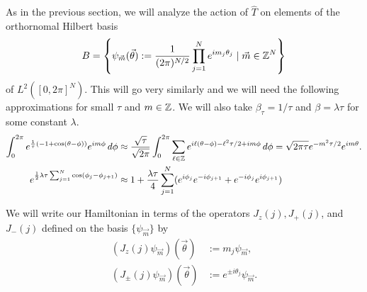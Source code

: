 \documentclass[11pt,reqno]{amsart}
\begin{document}
	As in the previous section, we will analyze the action of $\hat{T}$ on elements of the orthornomal Hilbert basis 
		\[ B=\left\{\psi_{\vec{m}}(\vec{\theta}) := \frac{1}{(2\pi)^{N/2}}\prod_{j=1}^N e^{im_j\theta_j} \mid \vec{m} \in \mathbb{Z}^N \right\} \]
	of $L^2([0,2\pi]^N)$.
	This will go very similarly and we will need the following approximations for small $\tau$ and $m\in \mathbb{Z}$.
	We will also take $\beta_\tau=1/\tau$ and $\beta=\lambda\tau$ for some constant $\lambda$.
	\begin{align}
		\int_0^{2\pi} e^{\frac{1}{\tau}(-1+\cos(\theta-\phi))}e^{im\phi} \, d\phi &\approx \frac{\sqrt{\tau}}{\sqrt{2\pi}} \int_0^{2\pi}\sum_{\ell \in \mathbb{Z}} e^{i\ell (\theta -\phi)-\ell^2\tau/2+im\phi}\, d\phi = \sqrt{2\pi \tau}e^{-m^2\tau/2} e^{im\theta}.\label{eq:O2_bessel_approx_int} \\
		e^{\frac{1}{2}\lambda\tau \sum_{j=1}^N \cos(\phi_j-\phi_{j+1})}&\approx 1+\frac{\lambda\tau}{4}\sum_{j=1}^N (e^{i\phi_j}e^{-i\phi_{j+1}}+e^{-i\phi_j}e^{i\phi_{j+1}}) \label{eq:O2_exp_cos_expansion}
	\end{align} 
	
	We will write our Hamiltonian in terms of the operators $J_z(j), J_+(j)$, and $J_-(j)$ defined on the basis $\{\psi_{\vec{m}} \}$ by
	\begin{align*}
		(J_z(j)\psi_{\vec{m}})(\vec{\theta}) &:= m_j \psi_{\vec{m}}, \\
		(J_{\pm}(j)\psi_{\vec{m}})(\vec{\theta}) &:= e^{\pm i \theta_j}\psi_{\vec{m}}.
	\end{align*} 
	
\end{document}
